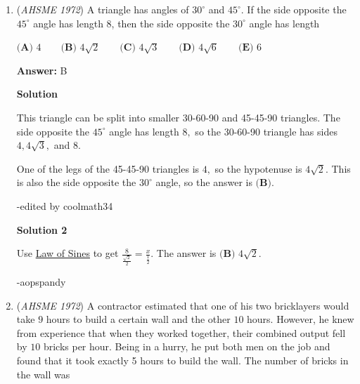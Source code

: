 \begin{enumerate}
 $\textbf{(A) }5:12\qquad \textbf{(B) }5:13\qquad \textbf{(C) }5:19\qquad \textbf{(D) }1:4\qquad  \textbf{(E) }5:21$

 \textbf{Answer: }C



\textbf{Solution}

Let the line passing through $M$ parallel to $AB$ intersect $AD$ and $BC$ and $S$ and $T$ respectively. Since $M$ is the midpoint of $AE$, $SM=\frac{5}{2}$ and $TM=12-\frac{5}{2}=\frac{19}{2}$. Since $\triangle PSM\sim \triangle QTM$, $PM:MQ=SM:MT=5:19$, hence our answer is $\fbox{C}$.

 


	\item (\textit{AHSME 1972}) A triangle has angles of $30^\circ$ and $45^\circ$. If the side opposite the $45^\circ$ angle has length $8$, then the side opposite the $30^\circ$ angle has length


 $\textbf{(A) }4\qquad \textbf{(B) }4\sqrt{2}\qquad \textbf{(C) }4\sqrt{3}\qquad \textbf{(D) }4\sqrt{6}\qquad  \textbf{(E) }6$

 \textbf{Answer: }B



\textbf{Solution}

This triangle can be split into smaller 30-60-90 and 45-45-90 triangles. The side opposite the $45^\circ$ angle has length $8,$ so the 30-60-90 triangle has sides $4, 4\sqrt3,$ and $8.$

 One of the legs of the 45-45-90 triangles is $4,$ so the hypotenuse is $4\sqrt2.$ This is also the side opposite the $30^\circ$ angle, so the answer is $\textbf{(B)}.$

 -edited by coolmath34

 



\textbf{Solution 2}

Use \href{https://artofproblemsolving.com/wiki/index.php?title=Law\_of\_Sines}{Law of Sines} to get $\frac{8}{\frac{\sqrt2}{2}}=\frac{x}{\frac{1}{2}}$. The answer is $\boxed{\textbf{(B) }4\sqrt{2}}$.

 -aopspandy

 


	\item (\textit{AHSME 1972}) A contractor estimated that one of his two bricklayers would take $9$ hours to build a certain wall and the other $10$ hours. 
However, he knew from experience that when they worked together, their combined output fell by $10$ bricks per hour. 
Being in a hurry, he put both men on the job and found that it took exactly 5 hours to build the wall. The number of bricks in the wall was



\end{enumerate}
